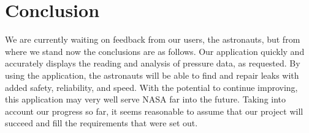 \documentclass[onecolumn, draftclsnofoot,10pt, compsoc]{IEEEtran}
\begin{document}
\section{Conclusion}

We are currently waiting on feedback from our users, the astronauts, but from where we stand now the conclusions are as follows.
Our application quickly and accurately displays the reading and analysis of pressure data, as requested.
By using the application, the astronauts will be able to find and repair leaks with added safety, reliability, and speed.
With the potential to continue improving, this application may very well serve NASA far into the future.
Taking into account our progress so far, it seems reasonable to assume that our project will succeed and fill the requirements that were set out.
​
%
%
%

\newpage


\end{document}
